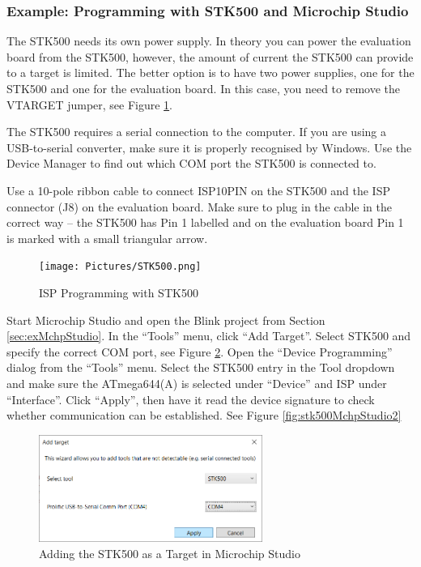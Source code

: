 \documentclass{article}
\begin{document}
\subsubsection{Example: Programming with STK500 and Microchip Studio}
The STK500 needs its own power supply. In theory you can power the evaluation board from the STK500, however, the amount of current the STK500 can provide to a target is limited. The better option is to have two power supplies, one for the STK500 and one for the evaluation board. In this case, you need to remove the VTARGET jumper, see Figure \ref{fig:stk500}. 

The STK500 requires a serial connection to the computer. If you are using a USB-to-serial converter, make sure it is properly recognised by Windows. Use the Device Manager to find out which COM port the STK500 is connected to. 

Use a 10-pole ribbon cable to connect ISP10PIN on the STK500 and the ISP connector (J8) on the evaluation board. Make sure to plug in the cable in the correct way -- the STK500 has Pin 1 labelled and on the evaluation board Pin 1 is marked with a small triangular arrow. 

\begin{figure}[htb]
\centering
\texttt{[image: Pictures/STK500.png]}
\caption{ISP Programming with STK500}
\label{fig:stk500}
\end{figure}

Start Microchip Studio and open the Blink project from Section \ref{sec:exMchpStudio}. In the ``Tools'' menu, click ``Add Target''. Select STK500 and specify the correct COM port, see Figure \ref{fig:stk500MchpStudio1}. Open the ``Device Programming'' dialog from the ``Tools'' menu. Select the STK500 entry in the Tool dropdown and make sure the ATmega644(A) is selected under ``Device'' and ISP under ``Interface''. Click ``Apply'', then have it read the device signature to check whether communication can be established. See Figure \ref{fig:stk500MchpStudio2}

\begin{figure}[htb]
\centering
\includegraphics[width=0.65\textwidth]{Pictures/STK500MchpStudio1.png}
\caption{Adding the STK500 as a Target in Microchip Studio}
\label{fig:stk500MchpStudio1}
\end{figure}
\end{document}
